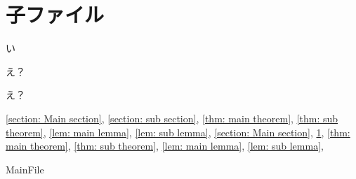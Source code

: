 \documentclass[uplatex,dvipdfmx]{jsarticle}
\begin{document}
\fi

\section{子ファイル}\label{section: sub section}
い
\begin{thm}\label{thm: sub theorem}
  え？
\end{thm}
\begin{lem}\label{lem: sub lemma}
  え？
\end{lem}

\autoref{section: Main section},
\autoref{section: sub section},
\autoref{thm: main theorem},
\autoref{thm: sub theorem},
\autoref{lem: main lemma},
\autoref{lem: sub lemma},
\ref{section: Main section},
\ref{section: sub section},
\ref{thm: main theorem},
\ref{thm: sub theorem},
\ref{lem: main lemma},
\ref{lem: sub lemma},

\ifcsname MainFile\endcsname\else
\end{document}
